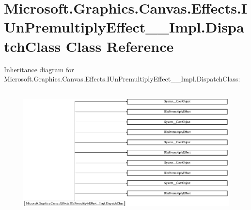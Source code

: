 \hypertarget{class_microsoft_1_1_graphics_1_1_canvas_1_1_effects_1_1_i_un_premultiply_effect_____impl_1_1_dispatch_class}{}\section{Microsoft.\+Graphics.\+Canvas.\+Effects.\+I\+Un\+Premultiply\+Effect\+\_\+\+\_\+\+Impl.\+Dispatch\+Class Class Reference}
\label{class_microsoft_1_1_graphics_1_1_canvas_1_1_effects_1_1_i_un_premultiply_effect_____impl_1_1_dispatch_class}
Inheritance diagram for Microsoft.\+Graphics.\+Canvas.\+Effects.\+I\+Un\+Premultiply\+Effect\+\_\+\+\_\+\+Impl.\+Dispatch\+Class\+:\begin{figure}[H]
\begin{center}
\leavevmode
\includegraphics[height=6.769231cm]{class_microsoft_1_1_graphics_1_1_canvas_1_1_effects_1_1_i_un_premultiply_effect_____impl_1_1_dispatch_class}
\end{center}
\end{figure}
